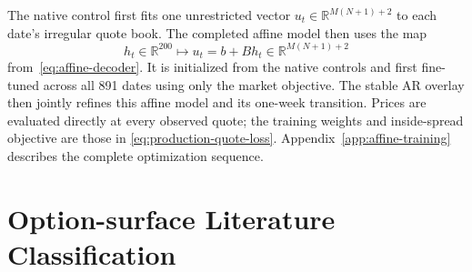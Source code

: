 \documentclass[11pt,a4paper]{article}
\newcommand{\R}{\mathbb{R}}
\begin{document}
The native control first fits one unrestricted vector
$u_t\in\R^{M(N+1)+2}$ to each date's irregular quote book.  The completed
affine model then uses the map
\[
  h_t\in\R^{200}
  \longmapsto
  u_t=b+Bh_t\in\R^{M(N+1)+2}
\]
from~\eqref{eq:affine-decoder}.  It is initialized from the native controls
and first fine-tuned across all 891 dates using only the market objective.
The stable AR overlay then jointly refines this affine model and its one-week
transition.  Prices are evaluated directly at every observed quote; the
training weights and inside-spread objective are those in
\eqref{eq:production-quote-loss}.  Appendix~\ref{app:affine-training}
describes the complete optimization sequence.

\clearpage
\section{Option-surface Literature Classification}
\label{app:literature-tables}

\end{document}
